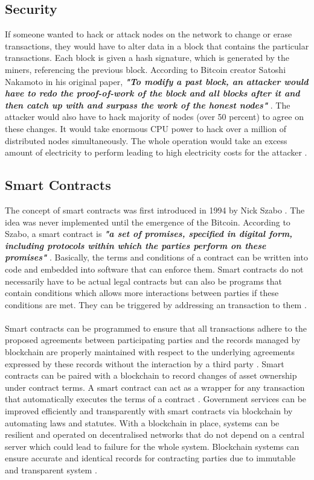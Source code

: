 \documentclass[report]{IEEEtran}
\begin{document}
 \subsection{Security}
 If someone wanted to hack or attack nodes on the network to change or erase transactions, they would have to alter data in a block that contains the particular transactions. Each block is given a hash signature, which is generated by the miners, referencing the previous block. According to Bitcoin creator Satoshi Nakamoto in his original paper, \textbf{\textit{"To modify a past block, an attacker would have to redo the proof-of-work of the block and all blocks after it and then catch up with and surpass the work of the honest nodes"}} \cite{bitcoin}. The attacker would also have to hack majority of nodes (over 50 percent) to agree on these changes. It would take enormous CPU power to hack over a million of distributed nodes simultaneously. The whole operation would take an excess amount of electricity to perform leading to high electricity costs for the attacker \cite{smartcon}.
 
 \subsection{Smart Contracts}
 The concept of smart contracts was first introduced in 1994 by Nick Szabo \cite{szabo}. The idea was never implemented until the emergence of the Bitcoin. According to Szabo, a smart contract is \textbf{\textit{"a set of promises, specified in digital form, including protocols within which the parties perform on these promises"}} \cite{szabo}. Basically, the terms and conditions of a contract can be written into code and embedded into software that can enforce them. Smart contracts do not necessarily have to be actual legal contracts but can also be programs that contain conditions which allows more interactions between parties if these conditions are met. They can be triggered by addressing an transaction to them \cite{smartcon}.
 \\\\ Smart contracts can be programmed to ensure that all transactions adhere to the proposed agreements between participating parties and the records managed by blockchain are properly maintained with respect to the underlying agreements expressed by these records without the interaction by a third party \cite{double}. Smart contracts can be paired with a blockchain to record changes of asset ownership under contract terms. A smart contract can act as a wrapper for any transaction that automatically executes the terms of a contract \cite{finance}. Government services can be improved efficiently and transparently with smart contracts via blockchain by automating laws and statutes. With a blockchain in place, systems can be resilient and operated on decentralised networks that do not depend on a central server which could lead to failure for the whole system. Blockchain systems can ensure accurate and identical records for contracting parties due to immutable and transparent system \cite{air}. 
\end{document}
